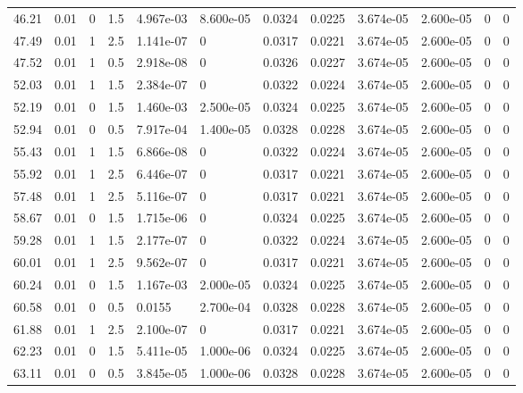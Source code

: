 \documentclass[preview]{standalone}
\begin{document}
{{{\begin{tabular}{L{1.2cm}C{1.2cm} C{0.3cm}C{0.5cm} C{1.4cm}C{1.4cm} C{1.4cm}C{1.4cm} C{1.6cm}C{1.6cm} C{1.6cm}C{1.6cm}}
  46.21  &  0.01  & 0     & 1.5 &  4.967e-03  & 8.600e-05  &  0.0324&   0.0225& 3.674e-05 & 2.600e-05   &  0 & 0  \\ 
  47.49  &  0.01  & 1     & 2.5 &  1.141e-07  & 0  &  0.0317&   0.0221& 3.674e-05 & 2.600e-05   &  0 & 0  \\ 
  47.52  &  0.01  & 1     & 0.5 &  2.918e-08  & 0  &  0.0326&   0.0227& 3.674e-05 & 2.600e-05   &  0 & 0  \\ 
  52.03  &  0.01  & 1     & 1.5 &  2.384e-07  & 0  &  0.0322&   0.0224& 3.674e-05 & 2.600e-05   &  0 & 0  \\ 
  52.19  &  0.01  & 0     & 1.5 &  1.460e-03  & 2.500e-05  &  0.0324&   0.0225& 3.674e-05 & 2.600e-05   &  0 & 0  \\ 
  52.94  &  0.01  & 0     & 0.5 &  7.917e-04  & 1.400e-05  &  0.0328&   0.0228& 3.674e-05 & 2.600e-05   &  0 & 0  \\ 
  55.43  &  0.01  & 1     & 1.5 &  6.866e-08  & 0  &  0.0322&   0.0224& 3.674e-05 & 2.600e-05   &  0 & 0  \\ 
  55.92  &  0.01  & 1     & 2.5 &  6.446e-07  & 0  &  0.0317&   0.0221& 3.674e-05 & 2.600e-05   &  0 & 0  \\ 
  57.48  &  0.01  & 1     & 2.5 &  5.116e-07  & 0  &  0.0317&   0.0221& 3.674e-05 & 2.600e-05   &  0 & 0  \\ 
  58.67  &  0.01  & 0     & 1.5 &  1.715e-06  & 0  &  0.0324&   0.0225& 3.674e-05 & 2.600e-05   &  0 & 0  \\ 
  59.28  &  0.01  & 1     & 1.5 &  2.177e-07  & 0  &  0.0322&   0.0224& 3.674e-05 & 2.600e-05   &  0 & 0  \\ 
  60.01  &  0.01  & 1     & 2.5 &  9.562e-07  & 0  &  0.0317&   0.0221& 3.674e-05 & 2.600e-05   &  0 & 0  \\ 
  60.24  &  0.01  & 0     & 1.5 &  1.167e-03  & 2.000e-05  &  0.0324&   0.0225& 3.674e-05 & 2.600e-05   &  0 & 0  \\ 
  60.58  &  0.01  & 0     & 0.5 &  0.0155  & 2.700e-04  &  0.0328&   0.0228& 3.674e-05 & 2.600e-05   &  0 & 0  \\ 
  61.88  &  0.01  & 1     & 2.5 &  2.100e-07  & 0  &  0.0317&   0.0221& 3.674e-05 & 2.600e-05   &  0 & 0  \\ 
  62.23  &  0.01  & 0     & 1.5 &  5.411e-05  & 1.000e-06  &  0.0324&   0.0225& 3.674e-05 & 2.600e-05   &  0 & 0  \\ 
  63.11  &  0.01  & 0     & 0.5 &  3.845e-05  & 1.000e-06  &  0.0328&   0.0228& 3.674e-05 & 2.600e-05   &  0 & 0  \\ 

\end{tabular}}}}
\end{document}
